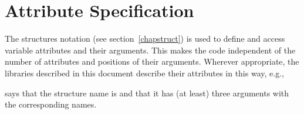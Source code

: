 \vfill %

\section{Attribute Specification}
The structures notation (see section~\ref{chapstruct})
is used to define
and access variable attributes and their arguments.
This makes the code independent of the number of attributes
and positions of their arguments.
Wherever appropriate, the libraries described in this document
describe their attributes in this way, e.g.,
\begin{quote}
\end{quote}
says that the structure name is  and that
it has (at least) three arguments with the corresponding names.%



